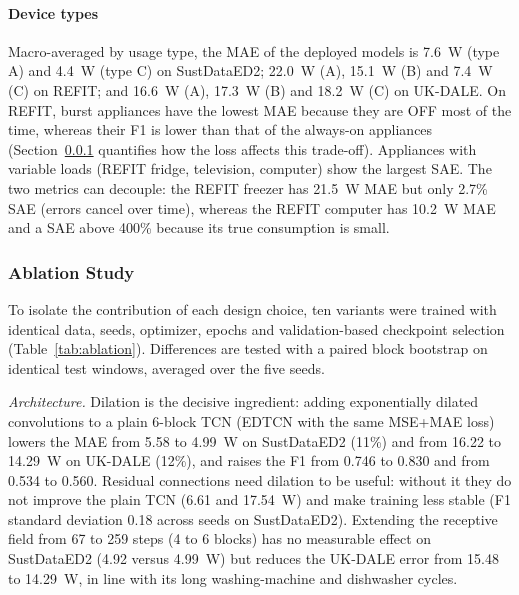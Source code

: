 \documentclass[fleqn,10pt]{wlscirep}
\begin{document}
\paragraph{Device types} Macro-averaged by usage type, the MAE of the deployed models is 7.6~W (type A) and 4.4~W (type C) on SustDataED2; 22.0~W (A), 15.1~W (B) and 7.4~W (C) on REFIT; and 16.6~W (A), 17.3~W (B) and 18.2~W (C) on UK-DALE. On REFIT, burst appliances have the lowest MAE because they are OFF most of the time, whereas their F1 is lower than that of the always-on appliances (Section~\ref{subsubsec:ablation} quantifies how the loss affects this trade-off). Appliances with variable loads (REFIT fridge, television, computer) show the largest SAE. The two metrics can decouple: the REFIT freezer has 21.5~W MAE but only 2.7\% SAE (errors cancel over time), whereas the REFIT computer has 10.2~W MAE and a SAE above 400\% because its true consumption is small.


\subsubsection{Ablation Study}
\label{subsubsec:ablation}

To isolate the contribution of each design choice, ten variants were trained with identical data, seeds, optimizer, epochs and validation-based checkpoint selection (Table~\ref{tab:ablation}). Differences are tested with a paired block bootstrap on identical test windows, averaged over the five seeds.

\textit{Architecture.} Dilation is the decisive ingredient: adding exponentially dilated convolutions to a plain 6-block TCN (EDTCN with the same MSE+MAE loss) lowers the MAE from 5.58 to 4.99~W on SustDataED2 (11\%) and from 16.22 to 14.29~W on UK-DALE (12\%), and raises the F1 from 0.746 to 0.830 and from 0.534 to 0.560. Residual connections need dilation to be useful: without it they do not improve the plain TCN (6.61 and 17.54~W) and make training less stable (F1 standard deviation 0.18 across seeds on SustDataED2). Extending the receptive field from 67 to 259 steps (4 to 6 blocks) has no measurable effect on SustDataED2 (4.92 versus 4.99~W) but reduces the UK-DALE error from 15.48 to 14.29~W, in line with its long washing-machine and dishwasher cycles.
\end{document}
